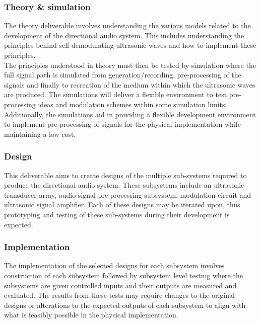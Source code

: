 \subsubsection{Theory \& simulation}
The theory deliverable involves understanding the various models related to the development of the directional audio system. This includes understanding the principles behind self-demodulating ultrasonic waves and how to implement these principles.\\
The principles understood in theory must then be tested by simulation where the full signal path is simulated from generation/recording, pre-processing of the signals and finally to recreation of the medium within which the ultrasonic waves are produced. The simulations will deliver a flexible environment to test pre-processing ideas and modulation schemes within some simulation limits. Additionally, the simulations aid in providing a flexible development environment to implement pre-processing of signals for the physical implementation while maintaining a low cost.
\subsubsection{Design}
This deliverable aims to create designs of the multiple sub-systems required to produce the directional audio system. These subsystems include an ultrasonic transducer array, audio signal pre-processing subsystem, modulation circuit and ultrasonic signal amplifier. Each of these designs may be iterated upon, thus prototyping and testing of these sub-systems during their development is expected.
\subsubsection{Implementation}
The implementation of the selected designs for each subsystem involves construction of each subsystem followed by subsystem level testing where the subsystems are given controlled inputs and their outputs are measured and evaluated. The results from these tests may require changes to the original designs or alterations to the expected outputs of each subsystem to align with what is feasibly possible in the physical implementation.
